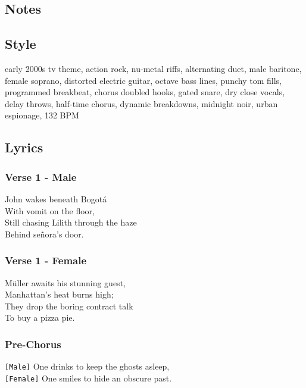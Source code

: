 \documentclass[]{article}
\begin{document}
\subsection{Notes}\label{notes-33}

\subsection{Style}\label{style-33}

early 2000s tv theme, action rock, nu-metal riffs, alternating duet,
male baritone, female soprano, distorted electric guitar, octave bass
lines, punchy tom fills, programmed breakbeat, chorus doubled hooks,
gated snare, dry close vocals, delay throws, half-time chorus, dynamic
breakdowns, midnight noir, urban espionage, 132 BPM

\subsection{Lyrics}\label{lyrics-33}

\subsubsection{Verse 1 - Male}\label{verse-1---male}

John wakes beneath Bogotá\\
With vomit on the floor,\\
Still chasing Lilith through the haze\\
Behind señora's door.

\subsubsection{Verse 1 - Female}\label{verse-1---female}

Müller awaits his stunning guest,\\
Manhattan's heat burns high;\\
They drop the boring contract talk\\
To buy a pizza pie.

\subsubsection{Pre-Chorus}\label{pre-chorus-36}

\texttt{{[}Male{]}} One drinks to keep the ghosts asleep,\\
\texttt{{[}Female{]}} One smiles to hide an obscure past.
\end{document}
